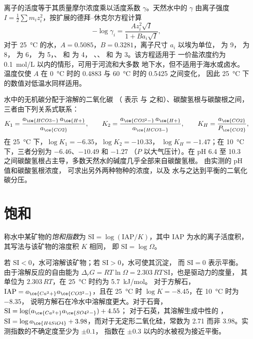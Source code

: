 离子的活度等于其质量摩尔浓度乘以活度系数
$\gamma$。天然水中的 $\gamma$ 由离子强度 $I =
\tfrac12\sum m_i z_i^2$，按扩展的德拜–休克尔方程计算
\[
-\log\gamma_i = \frac{A z_i^2\sqrt I}{1 + B a_i\sqrt I},
\]
对于 \qty{25}{\celsius} 的水，$A = 0.5085$，$B = 0.3281$，离子尺寸
$a_i$ 以埃为单位， 为 9， 为 8， 为 6，
 为 5，、 和  为 4，
、、 和  为 3。该方程适用于
一价盐浓度约为 \qty{0.1}{mol/L} 以内的情形，可用于河流和大多数
地下水，但不适用于海水或卤水。温度仅使 $A$ 在
\qty{0}{\celsius} 时的 0.4883 与 \qty{60}{\celsius} 时的 0.5425 之间变化，
因此 \qty{25}{\celsius} 下的数值对低温水同样适用。

水中的无机碳分配于溶解的二氧化碳
（ 表示  与  之和）、碳酸氢根与碳酸根之间，
三者由下列关系式联系：
\[
K_1 = \frac{a_{\ce{HCO3-}}\,a_{\ce{H+}}}{a_{\ce{CO2}}}, \qquad
K_2 = \frac{a_{\ce{CO3^2-}}\,a_{\ce{H+}}}{a_{\ce{HCO3-}}}, \qquad
K_H = \frac{a_{\ce{CO2}}}{P_{\ce{CO2}}},
\]
在 \qty{25}{\celsius} 下，$\log K_1 = -6.35$，$\log K_2 = -10.33$，
$\log K_H = -1.47$；在 \qty{10}{\celsius} 下，三者分别为 $-6.46$、$-10.49$ 和 $-1.27$
（$P$ 以大气压计）。在 pH 6.4 至 10.3 之间碳酸氢根占主导，多数天然水的碱度几乎全部来自碳酸氢根。
由实测的 pH 值和碳酸氢根浓度，
可求出另外两种物种的浓度，以及
水与之达到平衡的二氧化碳分压。

\section{饱和}\label{sec:b3:water-rock-interaction:saturation}

\begin{definition}[饱和指数]\label{def:b3:water-rock-interaction:si}
称水中某矿物的\emph{饱和指数}为
$\mathrm{SI} = \log(\mathrm{IAP}/K)$，其中 IAP 为水的离子活度积，
其写法与该矿物的溶度积 $K$ 相同，
即 $\mathrm{SI} = \log\Omega$。
\end{definition}

若 $\mathrm{SI} < 0$，水可溶解该矿物；若 $\mathrm{SI} > 0$，水可使其沉淀，
而 $\mathrm{SI} = 0$ 表示平衡。
由于溶解反应的自由能为 $\Delta_r G = RT\ln\Omega
= 2.303\,RT\,\mathrm{SI}$，也是驱动力的度量，
其单位为 $2.303\,RT$，在 \qty{25}{\celsius} 时约为 \qty{5.7}{kJ/mol}。
对于方解石，$\mathrm{IAP} = a_{\ce{Ca^2+}}
a_{\ce{CO3^2-}}$，且在 \qty{25}{\celsius} 时 $\log K = -8.45$，在 \qty{10}{\celsius} 时为 $-8.35$，
说明方解石在冷水中溶解度更大。对于石膏，$\mathrm{SI} = \log(a_{\ce{Ca^2+}}a_{\ce{SO4^2-}}) + 4.55$；
对于石英，其溶解生成中性的 ，$\mathrm{SI} = \log
a_{\ce{H4SiO4}} + 3.98$，而对于无定形二氧化硅，常数为 2.71
而非 3.98。实测指数的不确定度至少为 $\pm0.1$，
指数在 $\pm0.3$ 以内的水被视为接近平衡。

